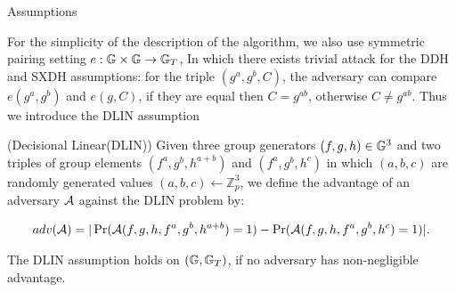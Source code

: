 \begin{subsection}{Assumptions}
  
  For the simplicity of the description of the algorithm, we also use symmetric pairing setting $e: \mathbb{G} \times \mathbb{G} \to \mathbb{G}_T$,
  In which there exists trivial attack for the DDH and SXDH assumptions: for the triple $(g^a, g^b, C)$, the adversary can compare $e(g^a, g^b)$ and $e(g, C)$, if they are equal then $C = g^{ab}$, otherwise $C \neq g^{ab}$.
  Thus we introduce the DLIN assumption
  \begin{myDef}{(Decisional Linear(DLIN))}
    Given three group generators $(f, g, h) \in \mathbb{G}^3$ and two triples of group elements $(f^a, g^b, h^{a+b})$ and $(f^a, g^b, h^c)$ in which $(a, b, c)$ are randomly generated values $(a, b, c) \gets \mathbb{Z}_p^3$, we define the advantage of an adversary $\mathcal{A}$ against the DLIN problem by:

    \begin{align*}
      adv(\mathcal{A}) = |\operatorname{Pr}(\mathcal{A}(f, g, h, f^a, g^b, h^{a+b}) = 1) - \operatorname{Pr}(\mathcal{A}(f, g, h, f^a, g^b, h^c) = 1)|.
    \end{align*}

    The DLIN assumption holds on $(\mathbb{G}, \mathbb{G}_T)$, if no adversary has non-negligible advantage.
  \end{myDef}


  

\end{subsection}




